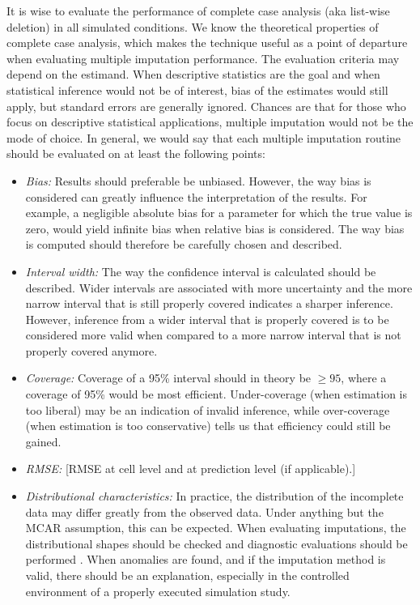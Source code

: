 \documentclass[bimj,fleqn]{w-art}
\theoremstyle{plain}
\theoremstyle{definition}
\begin{document}
It is wise to evaluate the performance of complete case analysis (aka list-wise deletion) in all simulated conditions. We know the theoretical properties of complete case analysis, which makes the technique useful as a point of departure when evaluating multiple imputation performance. 
The evaluation criteria may depend on the estimand. When descriptive statistics are the goal and when statistical inference would not be of interest, bias of the estimates would still apply, but standard errors are generally ignored. Chances are that for those who focus on descriptive statistical applications, multiple imputation would not be the mode of choice. In general, we would say that each multiple imputation routine should be evaluated on at least the following points:
\begin{itemize}
  \item \emph{Bias:} Results should preferable be unbiased. However, the way bias is considered can greatly influence the interpretation of the results. For example, a negligible absolute bias for a parameter for which the true value is zero, would yield infinite bias when relative bias is considered. The way bias is computed should therefore be carefully chosen and described. 
  \item \emph{Interval width:} The way the confidence interval is calculated should be described. Wider intervals are associated with more uncertainty and the more narrow interval that is still properly covered indicates a sharper inference. However, inference from a wider interval that is properly covered is to be considered more valid when compared to a more narrow interval that is not properly covered anymore. 
  \item \emph{Coverage:} Coverage of a 95\% interval should in theory be $\geq 95$, where a coverage of 95\% would be most efficient. Under-coverage (when estimation is too liberal) may be an indication of invalid inference, while over-coverage (when estimation is too conservative) tells us that efficiency could still be gained. 
  \item \emph{RMSE:} [RMSE at cell level and at prediction level (if applicable).]
  \item \emph{Distributional characteristics:} In practice, the distribution of the incomplete data may differ greatly from the observed data. Under anything but the MCAR assumption, this can be expected. When evaluating imputations, the distributional shapes should be checked and diagnostic evaluations should be performed \citep[see][for an detailed overview of diagnostic evaluation for multivariate imputations]{abayomi2008diagnostics}. When anomalies are found, and if the imputation method is valid, there should be an explanation, especially in the controlled environment of a properly executed simulation study. 

\end{itemize}
\end{document}
